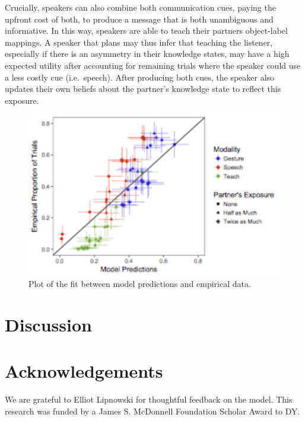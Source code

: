 \documentclass[10pt, letterpaper]{article}
\newenvironment{CodeChunk}{}{}
\begin{document}
Crucially, speakers can also combine both communication cues, paying the
upfront cost of both, to produce a message that is both unambiguous and
informative. In this way, speakers are able to teach their partners
object-label mappings. A speaker that plans may thus infer that teaching
the listener, especially if there is an asymmetry in their knowledge
states, may have a high expected utility after accounting for remaining
trials where the speaker could use a less costly cue (i.e.~speech).
After producing both cues, the speaker also updates their own beliefs
about the partner's knowledge state to reflect this exposure.

\begin{CodeChunk}
\begin{figure}[H]

{\centering \includegraphics{figs/image4-1} 

}

\caption[Plot of the fit between model predictions and empirical data]{Plot of the fit between model predictions and empirical data.}\label{fig:image4}
\end{figure}
\end{CodeChunk}

\section{Discussion}\label{discussion}

\section{Acknowledgements}\label{acknowledgements}

We are grateful to Elliot Lipnowski for thoughtful feedback on the
model. This research was funded by a James S. McDonnell Foundation
Scholar Award to DY.
\end{document}

